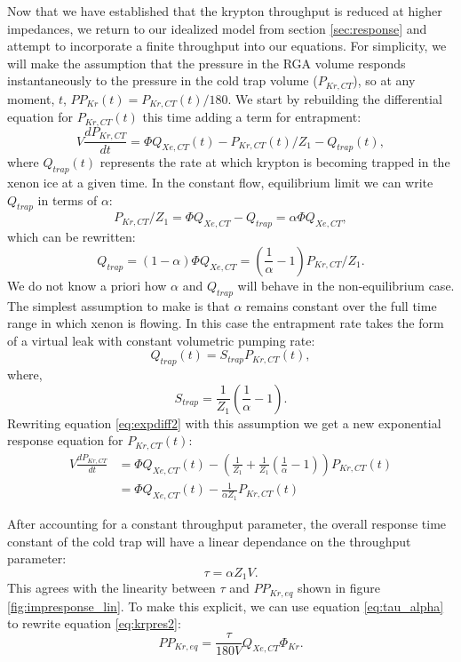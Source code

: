 Now that we have established that the krypton throughput is reduced at higher impedances, we return to our idealized model from section \ref{sec:response} and attempt to incorporate a finite throughput into our equations. For simplicity, we will make the assumption that the pressure in the RGA volume responds instantaneously to the pressure in the cold trap volume ($P_{Kr,CT}$), so at any moment, $t$, $PP_{Kr}(t)=P_{Kr,CT}(t)/180$. We start by rebuilding the differential equation for $P_{Kr,CT}(t)$ this time adding a term for entrapment:
\begin{equation}
\label{eq:expdiff2}
V\frac{dP_{Kr,CT}}{dt}=\Phi Q_{Xe,CT}(t)-P_{Kr,CT}(t)/Z_1-Q_{trap}(t),
\end{equation}
where $Q_{trap}(t)$ represents the rate at which krypton is becoming trapped in the xenon ice at a given time. In the constant flow, equilibrium limit we can write $Q_{trap}$ in terms of $\alpha$:
\begin{equation}
P_{Kr,CT}/Z_1= \Phi Q_{Xe,CT}-Q_{trap}=\alpha \Phi Q_{Xe,CT},
\end{equation}
which can be rewritten:
\begin{equation}
Q_{trap}=(1-\alpha )\Phi Q_{Xe,CT}=(\frac{1}{\alpha}-1)P_{Kr,CT}/Z_1.
\end{equation}
We do not know a priori how $\alpha$ and $Q_{trap}$ will behave in the non-equilibrium case. The simplest assumption to make is that $\alpha$ remains constant over the full time range in which xenon is flowing. In this case the entrapment rate takes the form of a virtual leak with constant volumetric pumping rate: 
\begin{equation}
Q_{trap}(t) = S_{trap}P_{Kr,CT}(t),
\end{equation}
where,
\begin{equation}
\label{eq:strap}
S_{trap}=\frac{1}{Z_1}(\frac{1}{\alpha}-1).
\end{equation}
Rewriting equation \ref{eq:expdiff2} with this assumption we get a new exponential response equation for $P_{Kr,CT}(t)$:
\begin{align}
 \label{eq:expdiff3}
V\frac{dP_{Kr,CT}}{dt}&=\Phi Q_{Xe,CT}(t)-(\frac{1}{Z_1}+\frac{1}{Z_1}(\frac{1}{\alpha}-1))P_{Kr,CT}(t)\\
&=\Phi Q_{Xe,CT}(t)-\frac{1}{\alpha Z_1}P_{Kr,CT}(t)
\end{align}

After accounting for a constant throughput parameter, the overall response time constant of the cold trap will have a linear dependance on the throughput parameter:
\begin{equation}
\label{eq:tau_alpha}
\tau=\alpha Z_1 V.
\end{equation}
This agrees with the linearity between $\tau$ and $PP_{Kr,eq}$ shown in figure \ref{fig:impresponse_lin}. To make this explicit, we can use equation \ref{eq:tau_alpha} to rewrite equation \ref{eq:krpres2}:
\begin{equation}
\label{eq:krpres3}
PP_{Kr,eq}=\frac{\tau}{180V}Q_{Xe,CT}\Phi_{Kr}.
\end{equation}

